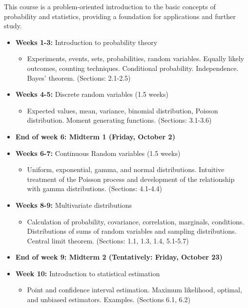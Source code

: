 \documentclass[10pt]{article}
\theoremstyle{definition}
\newcommand{\1}[1]{\textbf{1}_{\left[#1\right]}} %
\begin{document}
This course is a problem-oriented introduction to the basic concepts of probability and statistics,
providing a foundation for applications and further study.

\begin{itemize}
  \item \textbf{Weeks 1-3:} Introduction to probability theory 
  \begin{itemize}
    \item Experiments, events, sets, probabilities, random variables. Equally likely outcomes, counting
    techniques. Conditional probability. Independence. Bayes' theorem. (Sections: 2.1-2.5)
  \end{itemize}
  \item \textbf{Weeks 4-5:} Discrete random variables (1.5 weeks)
  \begin{itemize}
    \item Expected values, mean, variance, binomial distribution, Poisson
    distribution. Moment generating functions. (Sections: 3.1-3.6)
  \end{itemize}
  \item \textbf{End of week 6: Midterm 1 (Friday, October 2)}
  \item \textbf{Weeks 6-7:} Continuous Random variables (1.5 weeks)
  \begin{itemize}
    \item Uniform, exponential, gamma, and normal distributions.
    Intuitive treatment of the Poisson process and development of the relationship with gamma
    distributions. (Sections: 4.1-4.4)
  \end{itemize}
  \item \textbf{Weeks 8-9:} Multivariate distributions
  \begin{itemize}
    \item Calculation of probability, covariance, correlation, marginals, conditions. Distributions of
    sums of random variables and sampling distributions. Central limit theorem. (Sections: 1.1, 1.3, 1.4, 5.1-5.7)
  \end{itemize}
  \item \textbf{End of week 9: Midterm 2 (Tentatively: Friday, October 23)}
  
  \item \textbf{Week 10:} Introduction to statistical estimation
  \begin{itemize}
    \item Point and confidence interval estimation. Maximum likelihood, optimal, and unbiased estimators.
    Examples. (Sections 6.1, 6.2)
  \end{itemize}
  

\end{itemize}
\end{document}
